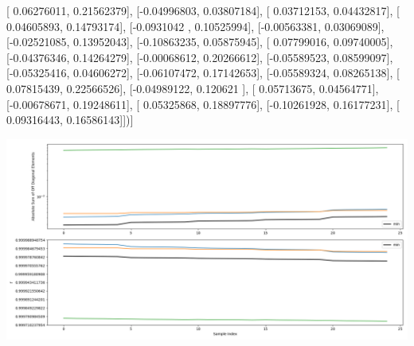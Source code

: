 \documentclass{article}
\begin{document}
       [ 0.06276011,  0.21562379],
       [-0.04996803,  0.03807184],
       [ 0.03712153,  0.04432817],
       [ 0.04605893,  0.14793174],
       [-0.0931042 ,  0.10525994],
       [-0.00563381,  0.03069089],
       [-0.02521085,  0.13952043],
       [-0.10863235,  0.05875945],
       [ 0.07799016,  0.09740005],
       [-0.04376346,  0.14264279],
       [-0.00068612,  0.20266612],
       [-0.05589523,  0.08599097],
       [-0.05325416,  0.04606272],
       [-0.06107472,  0.17142653],
       [-0.05589324,  0.08265138],
       [ 0.07815439,  0.22566526],
       [-0.04989122,  0.120621  ],
       [ 0.05713675,  0.04564771],
       [-0.00678671,  0.19248611],
       [ 0.05325868,  0.18897776],
       [-0.10261928,  0.16177231],
       [ 0.09316443,  0.16586143]])]
\begin{center}
\includegraphics[scale=.9]{report_pickled_controls208/control_dpn_all.png}

\end{center}
\end{document}
